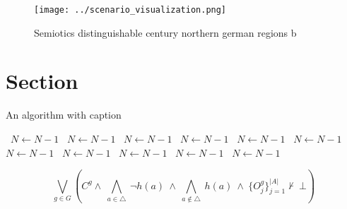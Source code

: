 \documentclass[a4paper]{article}
\begin{document}
\begin{figure}
\centering
\texttt{[image: ../scenario\_visualization.png]}
\caption{Semiotics distinguishable century northern german regions b
}
\end{figure}
 
\section{Section}

\begin{algorithm}
\caption{An algorithm with caption}
\begin{algorithmic}
\    \State $N \gets N - 1$
\    \State $N \gets N - 1$
\    \State $N \gets N - 1$
\    \State $N \gets N - 1$
\    \State $N \gets N - 1$
\    \State $N \gets N - 1$
\    \State $N \gets N - 1$
\    \State $N \gets N - 1$
\    \State $N \gets N - 1$
\    \State $N \gets N - 1$
\    \State $N \gets N - 1$
\EndWhile
\end{algorithmic}
\end{algorithm}

\[\bigvee_{g\in G} (C^g \wedge\ \bigwedge_{a\in \triangle}\ \neg h(a)\ \wedge\ \bigwedge_{a\notin \triangle}\ h(a)\ \wedge\ \{O_j^g\}_{j=1}^{|A|} \nvdash\ \bot )\]
\end{document}
